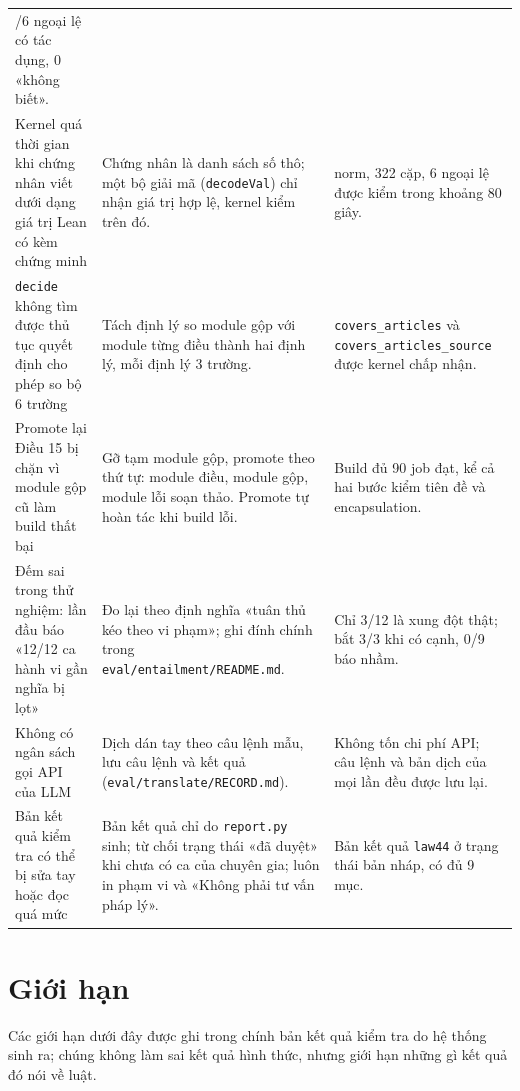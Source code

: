 \documentclass[12pt,a4paper]{article}
\newcommand{\code}[1]{\texttt{#1}}
\begin{document}
\begin{longtable}{>{\raggedright\arraybackslash}p{4.1cm}>{\raggedright\arraybackslash}p{6.0cm}>{\raggedright\arraybackslash}p{4.3cm}}
6/6 ngoại lệ có tác dụng, 0 «không biết».\\
Kernel quá thời gian khi chứng nhân viết dưới dạng giá trị Lean có kèm chứng minh &
Chứng nhân là danh sách số thô; một bộ giải mã (\code{decodeVal}) chỉ nhận giá trị hợp lệ, kernel kiểm trên đó. &
77 norm, 322 cặp, 6 ngoại lệ được kiểm trong khoảng 80 giây.\\
\code{decide} không tìm được thủ tục quyết định cho phép so bộ 6 trường &
Tách định lý so module gộp với module từng điều thành hai định lý, mỗi định lý 3 trường. &
\code{covers\_articles} và \code{covers\_articles\_source} được kernel chấp nhận.\\
Promote lại Điều 15 bị chặn vì module gộp cũ làm build thất bại &
Gỡ tạm module gộp, promote theo thứ tự: module điều, module gộp, module lỗi soạn thảo. Promote tự hoàn tác khi build lỗi. &
Build đủ 90 job đạt, kể cả hai bước kiểm tiên đề và encapsulation.\\
Đếm sai trong thử nghiệm: lần đầu báo «12/12 ca hành vi gần nghĩa bị lọt» &
Đo lại theo định nghĩa «tuân thủ kéo theo vi phạm»; ghi đính chính trong \code{eval/entailment/README.md}. &
Chỉ 3/12 là xung đột thật; bắt 3/3 khi có cạnh, 0/9 báo nhầm.\\
Không có ngân sách gọi API của LLM &
Dịch dán tay theo câu lệnh mẫu, lưu câu lệnh và kết quả (\code{eval/translate/RECORD.md}). &
Không tốn chi phí API; câu lệnh và bản dịch của mọi lần đều được lưu lại.\\
Bản kết quả kiểm tra có thể bị sửa tay hoặc đọc quá mức &
Bản kết quả chỉ do \code{report.py} sinh; từ chối trạng thái «đã duyệt» khi chưa có ca của chuyên gia; luôn in phạm vi và «Không
phải tư vấn pháp lý». &
Bản kết quả \code{law44} ở trạng thái bản nháp, có đủ 9 mục.\\
\end{longtable}

\section{Giới hạn}

\begin{warnbox}
Các giới hạn dưới đây được ghi trong chính bản kết quả kiểm tra do hệ thống sinh ra; chúng không làm sai kết quả hình thức, nhưng giới hạn
những gì kết quả đó nói về luật.
\end{warnbox}
\end{document}
